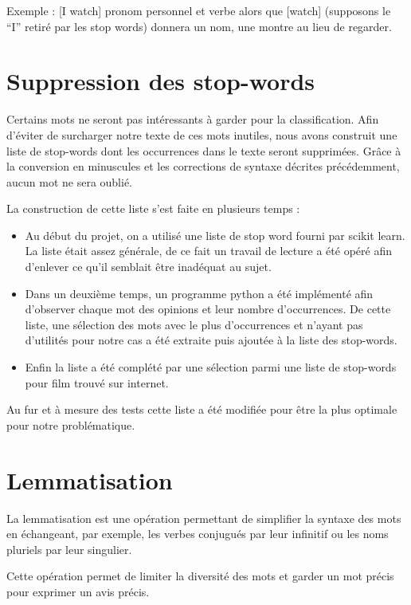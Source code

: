 \documentclass[a4paper]{report}
\begin{document}
                Exemple : [I watch] pronom personnel et verbe alors que [watch] (supposons le “I” retiré par les stop words) donnera un nom, une montre au lieu de regarder.

        \section{Suppression des stop-words}

            Certains mots ne seront pas intéressants à garder pour la classification. Afin d'éviter de surcharger notre texte de ces mots inutiles, nous avons construit une liste de stop-words dont les occurrences dans le texte seront supprimées. Grâce à la conversion en minuscules et les corrections de syntaxe décrites précédemment, aucun mot ne sera oublié.

            La construction de cette liste s’est faite en plusieurs temps :
            \begin{itemize}
                \item Au début du projet, on a utilisé une liste de stop word fourni par scikit learn. La liste était assez générale, de ce fait un travail de lecture a été opéré afin d’enlever ce qu’il semblait être inadéquat au sujet.
                \item Dans un deuxième temps, un programme python a été implémenté afin d’observer chaque mot des opinions et leur nombre d'occurrences. De cette liste, une sélection des mots avec le plus d'occurrences et n’ayant pas d’utilités pour notre cas a été extraite puis ajoutée à la liste des stop-words.
                \item Enfin la liste a été complété par une sélection parmi une liste de stop-words pour film trouvé sur internet.
            \end{itemize}

            Au fur et à mesure des tests cette liste a été modifiée pour être la plus optimale pour notre problématique.

        \section{Lemmatisation}

        La lemmatisation est une opération permettant de simplifier la syntaxe des mots en échangeant, par exemple, les verbes conjugués par leur infinitif ou les noms pluriels par leur singulier.

        Cette opération permet de limiter la diversité des mots et garder un mot précis pour exprimer un avis précis.
\end{document}
